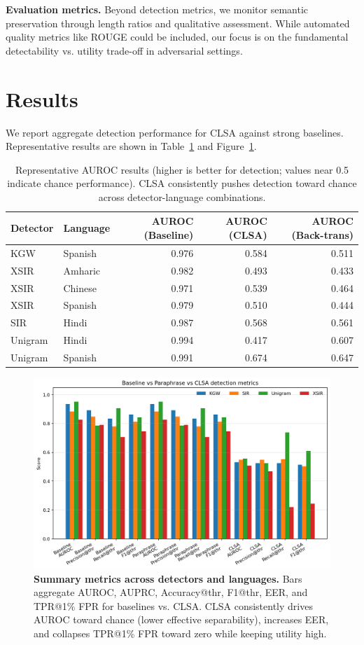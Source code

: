 \documentclass{article}
\begin{document}
\textbf{Evaluation metrics.} Beyond detection metrics, we monitor semantic preservation through length ratios and qualitative assessment. While automated quality metrics like ROUGE could be included, our focus is on the fundamental detectability vs. utility trade-off in adversarial settings.

\section{Results}

We report aggregate detection performance for CLSA against strong baselines. Representative results are shown in Table~\ref{tab:auroc} and Figure~\ref{fig:summary-bars}.

\begin{table}[t]
\centering
\caption{Representative AUROC results (higher is better for detection; values near 0.5 indicate chance performance). CLSA consistently pushes detection toward chance across detector-language combinations.}
\label{tab:auroc}
\begin{tabular}{l l r r r}
\toprule
Detector & Language & AUROC (Baseline) & AUROC (CLSA) & AUROC (Back-trans) \\
\midrule
KGW & Spanish & 0.976 & 0.584 & 0.511 \\
XSIR & Amharic & 0.982 & 0.493 & 0.433 \\
XSIR & Chinese & 0.971 & 0.539 & 0.464 \\
XSIR & Spanish & 0.979 & 0.510 & 0.444 \\
SIR & Hindi & 0.987 & 0.568 & 0.561 \\
Unigram & Hindi & 0.994 & 0.417 & 0.607 \\
Unigram & Spanish & 0.991 & 0.674 & 0.647 \\
\bottomrule
\end{tabular}
\end{table}

\begin{figure}[t]
\centering
\includegraphics[width=\linewidth]{summary_metrics_bars.png}
\caption{\textbf{Summary metrics across detectors and languages.} Bars aggregate AUROC, AUPRC, Accuracy@thr, F1@thr, EER, and TPR@1\% FPR for baselines vs. CLSA. CLSA consistently drives AUROC toward chance (lower effective separability), increases EER, and collapses TPR@1\% FPR toward zero while keeping utility high.}
\label{fig:summary-bars}
\end{figure}
\end{document}
